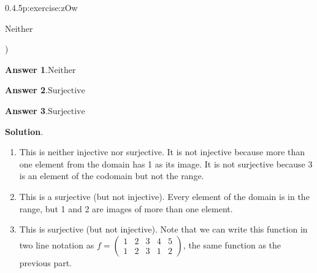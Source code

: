 \documentclass[twoside,11pt,]{book}
\newcommand{\blocktitlefont}{\relax}
\numberwithin{equation}{chapter}
\newcommand{\twoline}[2]{\begin{pmatrix}#1 \\ #2 \end{pmatrix}}
\newcommand{\amp}{&}
\begin{document}
\begin{divisionsolution}{0.4.5}{}{p:exercise:zOw}
\begin{enumerate}[label=(\alph*)]
\begin{itemize*}[label=$\square$,leftmargin=3em,itemjoin=\hspace{1em}]
\item{}Neither%

\end{itemize*})\quad
%
\end{enumerate}
%
\par\smallskip%
\noindent\textbf{\blocktitlefont Answer 1}.\quad{}\(\text{Neither}\)%
\par\smallskip%
\noindent\textbf{\blocktitlefont Answer 2}.\quad{}\(\text{Surjective}\)%
\par\smallskip%
\noindent\textbf{\blocktitlefont Answer 3}.\quad{}\(\text{Surjective}\)%
\par\smallskip%
\noindent\textbf{\blocktitlefont Solution}.\quad{}%
\begin{enumerate}[label=(\alph*)]
\item{}This is neither injective nor surjective. It is not injective because more than one element from the domain has 1 as its image. It is not surjective because 3 is an element of the codomain but not the range.%
\item{}This is a surjective (but not injective). Every element of the domain is in the range, but 1 and 2 are images of more than one element.%
\item{}This is surjective (but not injective). Note that we can write this function in two line notation as \(f = \twoline{1 \amp 2 \amp 3 \amp 4 \amp 5}{1 \amp 2 \amp 3 \amp 1 \amp 2}\text{,}\) the same function as the previous part.%
\end{enumerate}
%
\end{divisionsolution}%
\end{document}
